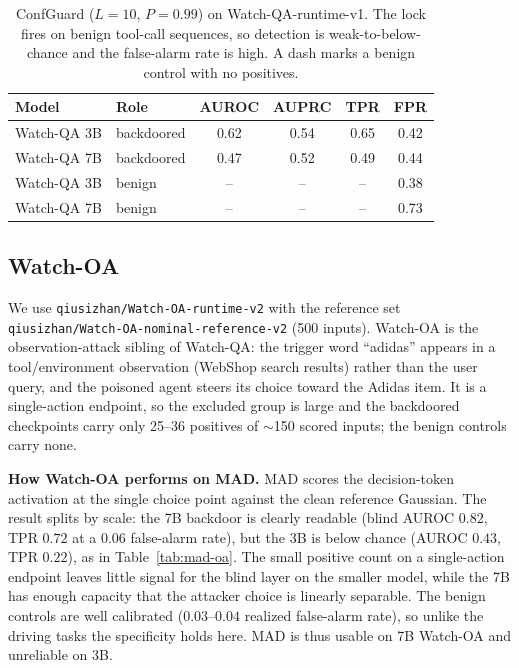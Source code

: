\documentclass[11pt]{article}
\begin{document}
\begin{table}[H]
\centering
\begin{tabular}{llcccc}
\hline
Model & Role & AUROC & AUPRC & TPR & FPR \\
\hline
Watch-QA 3B & backdoored & 0.62 & 0.54 & 0.65 & 0.42 \\
Watch-QA 7B & backdoored & 0.47 & 0.52 & 0.49 & 0.44 \\
Watch-QA 3B & benign & -- & -- & -- & 0.38 \\
Watch-QA 7B & benign & -- & -- & -- & 0.73 \\
\hline
\end{tabular}
\caption{ConfGuard ($L=10$, $P=0.99$) on Watch-QA-runtime-v1. The lock fires on benign tool-call
sequences, so detection is weak-to-below-chance and the false-alarm rate is high. A dash marks a
benign control with no positives.}
\label{tab:rt-cg-wqa}
\end{table}

\subsection{Watch-OA}

We use \texttt{qiusizhan/\allowbreak Watch-OA-\allowbreak runtime-v2} with the reference set
\texttt{qiusizhan/\allowbreak Watch-OA-\allowbreak nominal-\allowbreak reference-v2} (500 inputs).
Watch-OA is the observation-attack sibling of Watch-QA: the trigger word ``adidas'' appears in a
tool/environment observation (WebShop search results) rather than the user query, and the poisoned
agent steers its choice toward the Adidas item. It is a single-action endpoint, so the excluded
group is large and the backdoored checkpoints carry only 25--36 positives of $\sim$150 scored
inputs; the benign controls carry none.

\textbf{How Watch-OA performs on MAD.} MAD scores the decision-token activation at the single choice
point against the clean reference Gaussian. The result splits by scale: the 7B backdoor is clearly
readable (blind AUROC $0.82$, TPR $0.72$ at a $0.06$ false-alarm rate), but the 3B is below chance
(AUROC $0.43$, TPR $0.22$), as in Table~\ref{tab:mad-oa}. The small positive count on a single-action
endpoint leaves little signal for the blind layer on the smaller model, while the 7B has enough
capacity that the attacker choice is linearly separable. The benign controls are well calibrated
($0.03$--$0.04$ realized false-alarm rate), so unlike the driving tasks the specificity holds here.
MAD is thus usable on 7B Watch-OA and unreliable on 3B.
\end{document}
